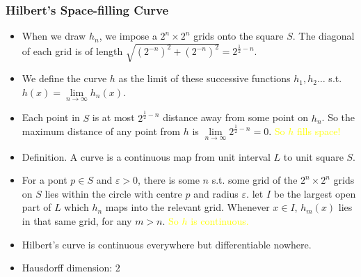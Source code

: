 \documentclass[UTF8,11pt,colorlinks,compress,openany]{beamer}%
\begin{document}
\begin{frame}\frametitle{Hilbert's Space-filling Curve}
\begin{itemize}
	\item When we draw $h_n$, we impose a $2^n\times 2^n$ grids onto the square $S$. The diagonal of each grid is of length $\sqrt{(2^{-n})^2+(2^{-n})^2}=2^{\frac{1}{2}-n}$.
	\item We define the curve $h$ as the limit of these successive functions $h_1,h_2\dots$ s.t. $h(x)=\lim\limits_{n\to\infty}h_n(x)$.
	\item Each point in $S$ is at most $2^{\frac{1}{2}-n}$ distance away from some point on $h_n$. So the maximum distance of any point from $h$ is $\lim\limits_{n\to\infty}2^{\frac{1}{2}-n}=0$. \textcolor{yellow}{So $h$ fills space!}
	\item Definition. A curve is a continuous map from unit interval $L$ to unit square $S$.
	\item For a pont $p\in S$ and $\varepsilon>0$, there is some $n$ s.t. some grid of the $2^n\times 2^n$ grids on $S$ lies within the circle with centre $p$ and radius $\varepsilon$. let $I$ be the largest open part of $L$ which $h_n$ maps into the relevant grid. Whenever $x\in I$, $h_m(x)$ lies in that same grid, for any $m>n$. \textcolor{yellow}{So $h$ is continuous.}
	\item Hilbert's curve is continuous everywhere but differentiable nowhere.
	\item Hausdorff dimension: $2$
\end{itemize}
\end{frame}
\end{document}
